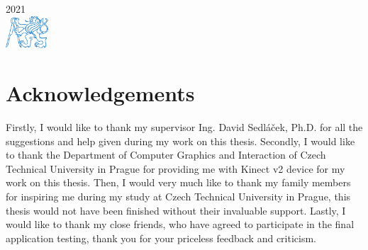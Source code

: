 \documentclass[a4paper]{report}
\newcommand\blankpage{%
    \null
    \thispagestyle{empty}%
    \addtocounter{page}{-1}%
    \newpage}
\begin{document}
\begin{titlepage}

{2021}\\[2cm] %


\includegraphics[width=60px, keepaspectratio]{images/CTU/ctu_logo_blue.pdf}\\[1cm] %

\vfill %
\afterpage{\blankpage}
\end{titlepage}







\chapter*{Acknowledgements}

\qquad Firstly, I would like to thank my supervisor Ing. David Sedláček, Ph.D. for all the suggestions
and help given during my work on this thesis. Secondly, I would like to thank the Department of Computer Graphics and Interaction of Czech Technical University in Prague for providing me with Kinect v2 device for my work on this thesis. Then, I would very much like to thank my family members for inspiring me during my study at Czech Technical University in Prague, this thesis would not have been finished without their invaluable support. Lastly, I would like to thank my close friends, who have agreed to participate in the final application testing, thank you for your priceless feedback and criticism.
\end{document}
